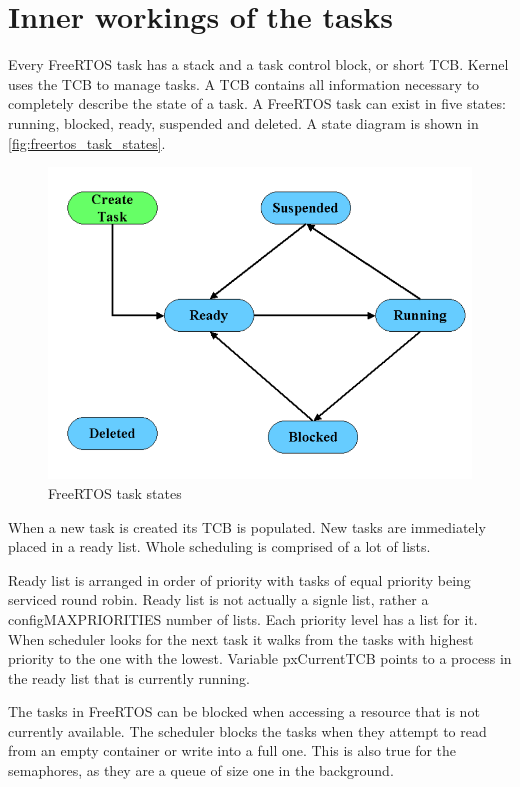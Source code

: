 \section{Inner workings of the tasks}
 

Every FreeRTOS task has a stack and a task control block, or short TCB. Kernel uses the TCB to manage tasks. A TCB contains all information necessary to completely describe the state of a task. \citep{freertos_inner_workings} A FreeRTOS task can exist in five states: running, blocked, ready, suspended and deleted. A state diagram is shown in \autoref{fig:freertos_task_states}.

\begin{figure}[H]

      \centering
      \includegraphics[width=0.7\linewidth]{images/freertos_task_states.png}
      \caption{FreeRTOS task states\citep[p~10]{freertos_inner_workings}}
      \label{fig:freertos_task_states}
    
\end{figure}

When a new task is created its TCB is populated. New tasks are immediately placed in a ready list. Whole scheduling is comprised of a lot of lists.

Ready list is arranged in order of priority with tasks of equal priority being serviced round robin. Ready list is not actually  a signle list, rather a configMAX\textunderscore PRIORITIES number of lists. Each priority level has a list for it. When scheduler looks for the next task it walks from the tasks with highest priority to the one with the lowest. Variable pxCurrentTCB points to a process in the ready list that is currently running.

The tasks in FreeRTOS can be blocked when accessing a resource that is not currently available. The scheduler blocks the tasks when they attempt to read from an empty container or write into a full one. This is also true for the semaphores, as they are a queue of size one in the background.

